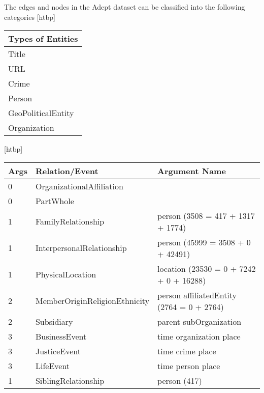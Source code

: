 \documentclass{tufte-handout}
\makeatletter
\renewenvironment{table}[1][htbp]{%
\@tufte@orig@float{table}[#1]}{%
\@tufte@orig@endfloat}%
\makeatother
\begin{document}
The edges and nodes in the Adept dataset can be classified into the following
categories
\begin{table}[htbp]
  \centering
  \begin{tabular}{l}
    \textbf{Types of Entities}\\\toprule
    Title\\
    URL\\
    Crime\\
    Person\\
    GeoPoliticalEntity\\
    Organization\\
  \end{tabular}
  \caption{Adept Node Types}
  \label{tab:adept-node-types}
\end{table}


\begin{table}[htbp]
  \centering
  \begin{tabular}{l l l}
 \textbf{Args} & \textbf{Relation/Event}       & \textbf{Argument Name}                            \\\toprule
 0             & OrganizationalAffiliation     &                                                   \\
 0             & PartWhole                     &                                                   \\
 1             & FamilyRelationship            & person (3508 = 417 + 1317 + 1774)                 \\
 1             & InterpersonalRelationship     & person (45999 = 3508 + 0 + 42491)                 \\
 1             & PhysicalLocation              & location (23530 = 0 + 7242 + 0 + 16288) \\
 2             & MemberOriginReligionEthnicity & person affiliatedEntity (2764 = 0 + 2764) \\
 2             & Subsidiary                    & parent subOrganization                            \\
 3             & BusinessEvent                 & time organization place                           \\
 3             & JusticeEvent                  & time crime place                                  \\
 3             & LifeEvent                     & time person place                                 \\\midrule
 1             & SiblingRelationship           & person (417)                                      \\

\end{tabular}
\end{table}
\end{document}
